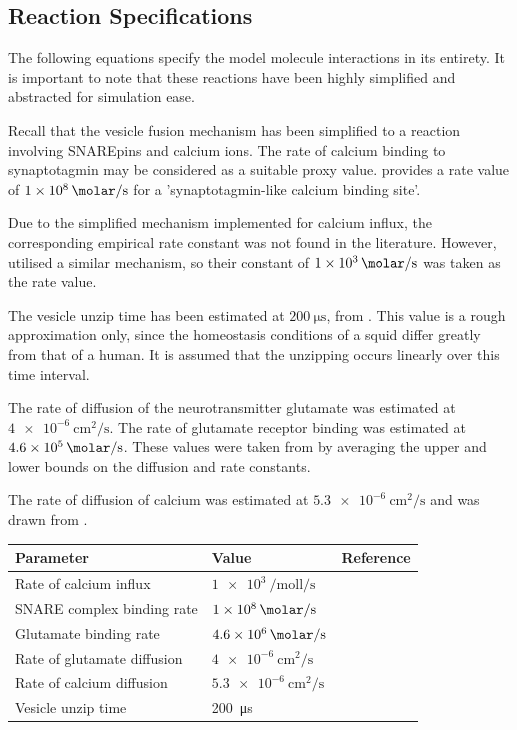 \documentclass[a4paper]{article}
\begin{document}
\subsection{Reaction Specifications}
The following equations specify the model molecule interactions in its entirety. It is important to note that these reactions have been highly simplified and abstracted for simulation ease.

Recall that the vesicle fusion mechanism has been simplified to a reaction involving SNAREpins and calcium ions. The rate of calcium binding to synaptotagmin may be considered as a suitable proxy value. \cite{ma2014quantitative} provides a rate value of $\SI{1e8}{\per\molar\per\second}$ for a 'synaptotagmin-like calcium binding site'. 

Due to the simplified mechanism implemented for calcium influx, the corresponding empirical rate constant was not found in the literature. However, \cite{Czech:MethodsMolBiol:2009} utilised a similar mechanism, so their constant of  $\SI{1e3}{\per\molar\per\second}$ was taken as the rate value.

The vesicle unzip time has been estimated at $\SI{200}{\micro\second}$, from \cite{Llinas:TheSquidGiantSynapseAModel:1999}. This value is a rough approximation only, since the homeostasis conditions of a squid differ greatly from that of a human. It is assumed that the unzipping occurs linearly over this time interval.

The rate of diffusion of the neurotransmitter glutamate was estimated at $\SI{4e-6}{\centi\metre\squared\per\second}$. The rate of glutamate receptor binding was estimated at $\SI{4.6e5}{\per\molar\per\second}$. These values were taken from \cite{rusakov2001role} by averaging the upper and lower bounds on the diffusion and rate constants.

The rate of diffusion of calcium was estimated at $\SI{5.3e-6}{\centi\metre\squared\per\second}$ and was drawn from \cite{Dittrich:BiophysJ:2013}.

\begin{table}[H]
\begin{tabular}{lll}
Parameter & Value & Reference \\ \hline
Rate of calcium influx   &  $\SI{1e3}{\per\mole\litre\per\second}$      &    \cite{Czech:MethodsMolBiol:2009} \\
SNARE complex binding rate & $\SI{1e8}{\per\molar\per\second}$ & \cite{ma2014quantitative}\\
Glutamate binding rate & $\SI{4.6e6}{\per\molar\per\second}$ & \cite{rusakov2001role} \\
Rate of glutamate diffusion & $\SI{4e-6}{\centi\metre\squared\per\second} $      &\cite{rusakov2001role} \\
Rate of calcium diffusion & $\SI{5.3e-6}{\centi\metre\squared\per\second} $      &\cite{Dittrich:BiophysJ:2013} \\
Vesicle unzip time & \SI{200}{\micro\second} & \cite{Llinas:TheSquidGiantSynapseAModel:1999}\\
\end{tabular}
\end{table}
\end{document}
